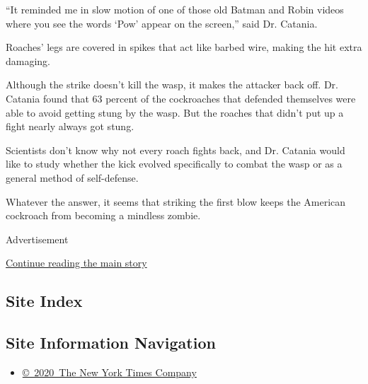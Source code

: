 ``It reminded me in slow motion of one of those old Batman and Robin
videos where you see the words `Pow' appear on the screen,'' said Dr.
Catania.

Roaches' legs are covered in spikes that act like barbed wire, making
the hit extra damaging.

Although the strike doesn't kill the wasp, it makes the attacker back
off. Dr. Catania found that 63 percent of the cockroaches that defended
themselves were able to avoid getting stung by the wasp. But the roaches
that didn't put up a fight nearly always got stung.

Scientists don't know why not every roach fights back, and Dr. Catania
would like to study whether the kick evolved specifically to combat the
wasp or as a general method of self-defense.

Whatever the answer, it seems that striking the first blow keeps the
American cockroach from becoming a mindless zombie.

Advertisement

\protect\hyperlink{after-bottom}{Continue reading the main story}

\hypertarget{site-index}{%
\subsection{Site Index}\label{site-index}}

\hypertarget{site-information-navigation}{%
\subsection{Site Information
Navigation}\label{site-information-navigation}}

\begin{itemize}
\tightlist
\item
  \href{https://help.nytimes3xbfgragh.onion/hc/en-us/articles/115014792127-Copyright-notice}{©~2020~The
  New York Times Company}
\end{itemize}

